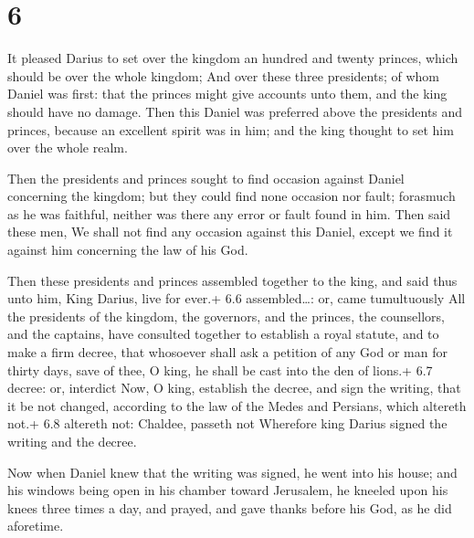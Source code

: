 \hypertarget{section-5}{%
\section{6}\label{section-5}}

 It pleased Darius to set over the kingdom an hundred and
twenty princes, which should be over the whole kingdom;  And
over these three presidents; of whom Daniel was first: that the princes
might give accounts unto them, and the king should have no damage.
 Then this Daniel was preferred above the presidents and
princes, because an excellent spirit was in him; and the king thought to
set him over the whole realm.

 Then the presidents and princes sought to find occasion
against Daniel concerning the kingdom; but they could find none occasion
nor fault; forasmuch as he was faithful, neither was there any error or
fault found in him.  Then said these men, We shall not find
any occasion against this Daniel, except we find it against him
concerning the law of his God.

 Then these presidents and princes assembled together to the
king, and said thus unto him, King Darius, live for ever.+ 6.6
assembled\ldots: or, came tumultuously  All the presidents
of the kingdom, the governors, and the princes, the counsellors, and the
captains, have consulted together to establish a royal statute, and to
make a firm decree, that whosoever shall ask a petition of any God or
man for thirty days, save of thee, O king, he shall be cast into the den
of lions.+ 6.7 decree: or, interdict  Now, O king, establish
the decree, and sign the writing, that it be not changed, according to
the law of the Medes and Persians, which altereth not.+ 6.8 altereth
not: Chaldee, passeth not  Wherefore king Darius signed the
writing and the decree.

 Now when Daniel knew that the writing was signed, he
went into his house; and his windows being open in his chamber toward
Jerusalem, he kneeled upon his knees three times a day, and prayed, and
gave thanks before his God, as he did aforetime.

